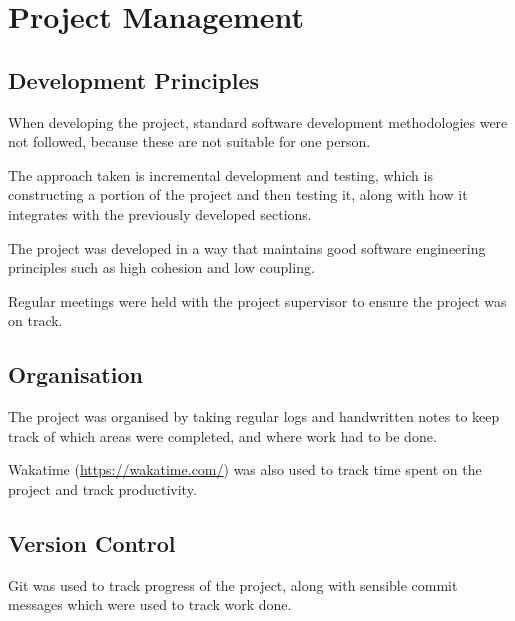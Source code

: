 \section{Project Management}
\subsection{Development Principles}
When developing the project, standard software development meth\-odologies were not followed, because these are not suitable for one person.\par
The approach taken is incremental development and testing, which is constructing a portion of the project and then testing it, along with how it integrates with the previously developed sections.\par
The project was developed in a way that maintains good software engineering principles such as high cohesion and low coupling.\par
Regular meetings were held with the project supervisor to ensure the project was on track.
\subsection{Organisation}
The project was organised by taking regular logs and handwritten notes to keep track of which areas were completed, and where work had to be done.\par
Wakatime (\url{https://wakatime.com/}) was also used to track time spent on the project and track productivity.
\subsection{Version Control}
Git was used to track progress of the project, along with sensible commit messages which were used to track work done.

